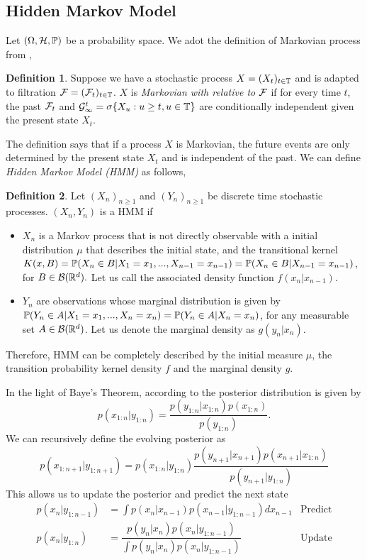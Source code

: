 \documentclass[10pt]{article}
\theoremstyle{definition}
\newtheorem{definition}{Definition}
\numberwithin{equation}{section}
\begin{document}
\subsection{Hidden Markov Model}
Let $(\Omega,\mathcal{H},\mathbb{P})$ be a probability space. We adot the definition of Markovian process from \cite{cinlar},
\begin{definition}
	Suppose we have a stochastic process $X= (X_t)_{t \in \mathbb{T}}$  and is adapted to filtration $\mathcal{F}=(\mathcal{F}_t)_{t \in \mathbb{T}}$.  $X$ is \textit{Markovian with relative to} $\mathcal{F}$ if for every time $t$, the past $\mathcal{F}_t$ and $\mathcal{G}^t_\infty = \sigma\{X_u: u \geq t, u \in \mathbb{T} \}$ are conditionally independent given the present state $X_t$.
\end{definition}
The definition says that if a process $X$ is Markovian, the future events are only determined by the present state $X_t$ and is independent of the past. We can define \textit{Hidden Markov Model (HMM)} as follows,
\begin{definition}
	Let $(X_n)_{n \geq 1}$ and $(Y_n)_{n \geq 1}$ be discrete time stochastic processes. $(X_n, Y_n)$ is a HMM if
	\begin{itemize}
		\item $X_n$ is a Markov process that is not directly observable with a initial distribution $\mu$ that describes the initial state, and the transitional kernel $K(x,B)  = \mathbb{P}(X_n \in B |  X_1 = x_1, ..., X_{n-1} = x_{n-1}) = \mathbb{P}(X_n \in B | X_{n-1}=x_{n-1})$, for $B \in \mathcal{B}(\mathbb{R}^d).$ Let us call the associated density function $f(x_n|x_{n-1})$.
		\item $Y_n$ are observations whose marginal distribution is given by $\mathbb{P}(Y_n \in A| X_1 = x_1, ..., X_n = x_n) = \mathbb{P}(Y_n \in A|X_n = x_n)$, for any measurable set $A \in \mathcal{B}(\mathbb{R}^d)$. Let us denote the marginal density as $g(y_n|x_n)$.
	\end{itemize}
	
	Therefore, HMM can be completely described by the initial measure $\mu$, the transition probability kernel density $f$ and the marginal density $g$.
	
\end{definition}

In the light of Baye's Theorem, according to \cite{SMCinPrac} the posterior distribution is given by
\begin{equation}
p(x_{1:n}|y_{1:n}) = \dfrac{p(y_{1:n}|x_{1:n})p(x_{1:n})}{p(y_{1:n})}.
\end{equation}
We can recursively define the evolving posterior as
\begin{equation}
p(x_{1:n+1}|y_{1:n+1}) = p(x_{1:n}|y_{1:n}) \dfrac{p(y_{n+1}|x_{n+1})p(x_{n+1}|x_{1:n})}{p(y_{n+1}|y_{1:n})}
\end{equation}
This allows us to update the posterior and predict the next state  
\begin{align}
p(x_n|y_{1:n-1}) &= \int p(x_{n}|x_{n-1})p(x_{n-1}|y_{1:n-1}) dx_{n-1} &\text{Predict}\\
p(x_n|y_{1:n}) &= \dfrac{p(y_n|x_n)p(x_n|y_{1:n-1})}{\int p(y_n|x_n)p(x_n|y_{1:n-1})} &\text{Update}
\end{align}
\end{document}
